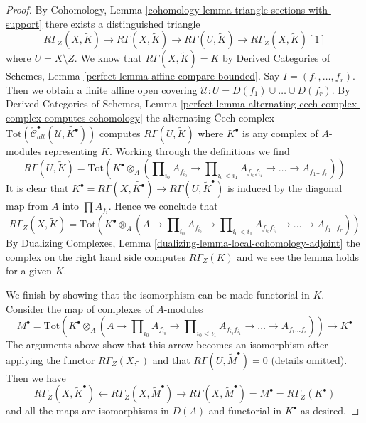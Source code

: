 \documentclass{stacks-project}
\theoremstyle{plain}
\theoremstyle{definition}
\theoremstyle{remark}
\numberwithin{equation}{subsection}
\begin{document}
\begin{proof}
By Cohomology, Lemma \ref{cohomology-lemma-triangle-sections-with-support}
there exists a distinguished triangle
$$
R\Gamma_Z(X, \widetilde{K})
\to R\Gamma(X, \widetilde{K})
\to R\Gamma(U, \widetilde{K})
\to R\Gamma_Z(X, \widetilde{K})[1]
$$
where $U = X \setminus Z$. We know that $R\Gamma(X, \widetilde{K}) = K$
by Derived Categories of Schemes, Lemma
\ref{perfect-lemma-affine-compare-bounded}.
Say $I = (f_1, \ldots, f_r)$. Then we obtain a finite affine
open covering $\mathcal{U} : U = D(f_1) \cup \ldots \cup D(f_r)$.
By Derived Categories of Schemes, Lemma
\ref{perfect-lemma-alternating-cech-complex-complex-computes-cohomology}
the alternating {\v C}ech complex
$\text{Tot}(\check{\mathcal{C}}_{alt}^\bullet(\mathcal{U},
\widetilde{K^\bullet}))$
computes $R\Gamma(U, \widetilde{K})$ where $K^\bullet$ is any
complex of $A$-modules representing $K$. Working through the
definitions we find
$$
R\Gamma(U, \widetilde{K}) =
\text{Tot}\left(
K^\bullet \otimes_A
(\prod\nolimits_{i_0} A_{f_{i_0}} \to
\prod\nolimits_{i_0 < i_1} A_{f_{i_0}f_{i_1}} \to
\ldots \to A_{f_1\ldots f_r})\right)
$$
It is clear that
$K^\bullet = R\Gamma(X, \widetilde{K^\bullet}) \to
R\Gamma(U, \widetilde{K}^\bullet)$
is induced by the diagonal map from $A$ into $\prod A_{f_i}$.
Hence we conclude that
$$
R\Gamma_Z(X, \widetilde{K}) =
\text{Tot}\left(
K^\bullet \otimes_A
(A \to \prod\nolimits_{i_0} A_{f_{i_0}} \to
\prod\nolimits_{i_0 < i_1} A_{f_{i_0}f_{i_1}} \to
\ldots \to A_{f_1\ldots f_r})\right)
$$
By Dualizing Complexes, Lemma \ref{dualizing-lemma-local-cohomology-adjoint}
the complex on the right hand side computes $R\Gamma_Z(K)$
and we see the lemma holds for a given $K$.

\medskip\noindent
We finish by showing that the isomorphism can be made functorial in $K$.
Consider the map of complexes of $A$-modules
$$
M^\bullet = \text{Tot}\left(
K^\bullet \otimes_A
(A \to \prod\nolimits_{i_0} A_{f_{i_0}} \to
\prod\nolimits_{i_0 < i_1} A_{f_{i_0}f_{i_1}} \to
\ldots \to A_{f_1\ldots f_r})\right)
\longrightarrow
K^\bullet
$$
The arguments above show that this arrow becomes an isomorphism after
applying the functor $R\Gamma_Z(X, \widetilde{\ })$ and that
$R\Gamma(U, \widetilde{M}^\bullet) = 0$ (details omitted). Then we have
$$
R\Gamma_Z(X, \widetilde{K}^\bullet)
\leftarrow
R\Gamma_Z(X, \widetilde{M}^\bullet)
\rightarrow
R\Gamma(X, \widetilde{M}^\bullet) = M^\bullet = R\Gamma_Z(K^\bullet)
$$
and all the maps are isomorphisms in $D(A)$ and functorial in $K^\bullet$
as desired.
\end{proof}
\end{document}
